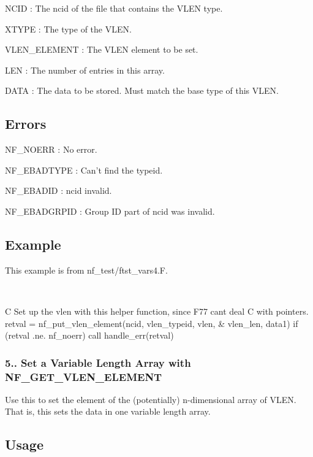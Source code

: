 {\ttfamily N\+C\+ID} \+: The ncid of the file that contains the V\+L\+EN type.

{\ttfamily X\+T\+Y\+PE} \+: The type of the V\+L\+EN.

{\ttfamily V\+L\+E\+N\+\_\+\+E\+L\+E\+M\+E\+NT} \+: The V\+L\+EN element to be set.

{\ttfamily L\+EN} \+: The number of entries in this array.

{\ttfamily D\+A\+TA} \+: The data to be stored. Must match the base type of this V\+L\+EN.

\subsection*{Errors }

{\ttfamily N\+F\+\_\+\+N\+O\+E\+RR} \+: No error.

{\ttfamily N\+F\+\_\+\+E\+B\+A\+D\+T\+Y\+PE} \+: Can’t find the typeid.

{\ttfamily N\+F\+\_\+\+E\+B\+A\+D\+ID} \+: ncid invalid.

{\ttfamily N\+F\+\_\+\+E\+B\+A\+D\+G\+R\+P\+ID} \+: Group ID part of ncid was invalid.

\subsection*{Example }

This example is from nf\+\_\+test/ftst\+\_\+vars4.\+F.

 

C Set up the vlen with this helper function, since F77 can\textquotesingle{}t deal C with pointers. retval = nf\+\_\+put\+\_\+vlen\+\_\+element(ncid, vlen\+\_\+typeid, vlen, \& vlen\+\_\+len, data1) if (retval .ne. nf\+\_\+noerr) call handle\+\_\+err(retval)

\subsubsection*{5.. Set a Variable Length Array with N\+F\+\_\+\+G\+E\+T\+\_\+\+V\+L\+E\+N\+\_\+\+E\+L\+E\+M\+E\+NT}

Use this to set the element of the (potentially) n-\/dimensional array of V\+L\+EN. That is, this sets the data in one variable length array.

\subsection*{Usage }

